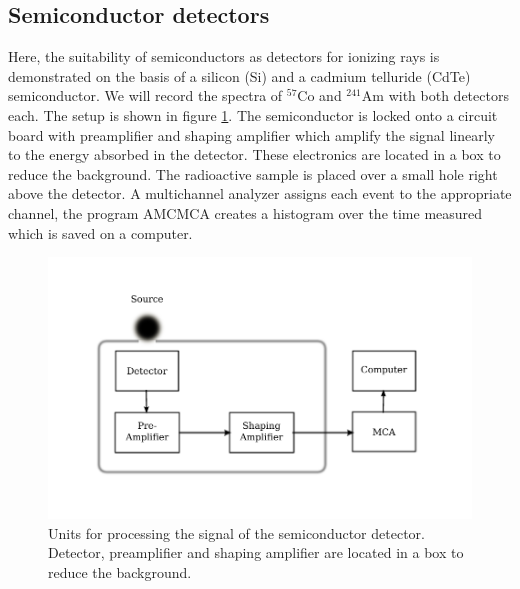\subsection{Semiconductor detectors}
Here, the suitability of semiconductors as detectors for 
ionizing rays is demonstrated on the basis of a silicon (Si)
and a cadmium telluride (CdTe) semiconductor. We will record 
the spectra of $^{57}$Co and $^{241}$Am with both detectors 
each. 
The setup is shown in figure \ref{fig:setup_detector}.
The semiconductor is
locked onto a circuit board with preamplifier and shaping 
amplifier which amplify the signal linearly to the energy 
absorbed in the detector. 
These electronics are located in a box to reduce the background. 
The radioactive sample is placed over a small hole right 
above the detector. 
A multichannel analyzer assigns each event to the appropriate 
channel, the program AMCMCA creates a histogram over the time measured
which is saved on a computer. 
\begin{figure}
    \includegraphics[width=\textwidth]{figures/setup_detector}
    \caption{
        Units for processing the signal of the semiconductor detector.
        Detector, preamplifier and shaping amplifier are located in 
        a box to reduce the background. 
        }
    \label{fig:setup_detector}
\end{figure}

